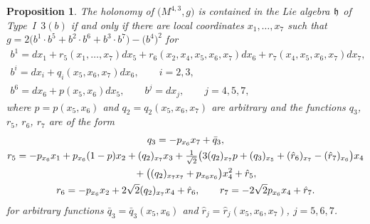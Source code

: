\documentclass[11pt]{article}
\numberwithin{equation}{section}
\newtheorem{Proposition}[Theorem]{Proposition}
 { \theoremstyle{definition}
\newtheorem{Definition}[Theorem]{Definition}
\newtheorem{Example}[Theorem]{Example}
\newtheorem{Remark}[Theorem]{Remark} }
\newcommand\fh{{\frak h}}
\begin{document}
\begin{Proposition} The holonomy of $\big(M^{4,3},g\big)$ is contained in the Lie algebra $\fh$ of Type~I~$3(b)$ if and only if there are local coordinates $x_1,\dots,x_7$ such that $g=2\big(b^1\cdot b^5+b^2\cdot b^6+b^3\cdot b^7\big)- \big(b^4\big)^2$ for
\begin{gather*}
b^1= dx_1 + r_5(x_1,\dots, x_7)dx_5+r_6(x_2,x_4,x_5, x_6,x_7)dx_6+r_7(x_4,x_5,x_6,x_7)dx_7, \\
b^i= dx_i+q_i(x_5,x_6,x_7)dx_6,\qquad i=2,3, \\
b^6= dx_6 + p(x_5,x_6) dx_5 ,\qquad
b^j= dx_j,\qquad j=4,5,7,
\end{gather*}
where
$p=p(x_5,x_6)$ and $q_2=q_2(x_5,x_6,x_7)$ are arbitrary and the functions $q_3$, $r_5$, $r_6$, $r_7$ are of the form
\begin{gather*}
q_3 = -p_{x_6}x_7+\bar q_3,\\
r_5 = -p_{x_6} x_1 +p_{x_6}(1-p)x_2 +(q_2)_{x_7}x_3+\tfrac1{\sqrt2}\big(3(q_2)_{x_7}p+(q_3)_{x_5}+(\hat r_6)_{x_7}-(\hat r_7)_{x_6}\big)x_4 \\
\hphantom{r_5 =}{} +\big((q_2)_{x_7 x_7}+p_{x_6 x_6}\big)x_4^2 +\hat r_5, \\
r_6 = -p_{x_6}x_2 +2\sqrt2 (q_2)_{x_7} x_4+\hat r_6,\qquad
r_7 = -2\sqrt2 p_{x_6}x_4 +\hat r_7.
\end{gather*}
for arbitrary functions $\bar q_3=\bar q_3(x_5,x_6)$ and $\hat r _j =\hat r_j(x_5,x_6,x_7)$, $j=5,6,7$.
\end{Proposition}
\end{document}
